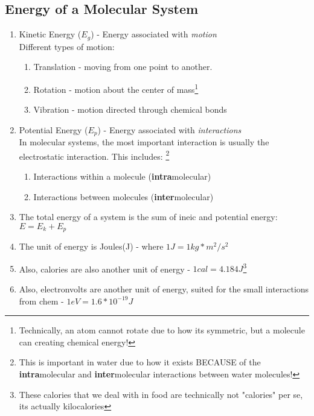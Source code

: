 \documentclass[../CHEM152Notes.tex]{subfiles}
\begin{document}
\subsection*{Energy of a Molecular System}
\begin{enumerate}
    \item Kinetic Energy ($E_g$) - Energy associated with \emph{motion} \\
    Different types of motion:
        \begin{enumerate}
            \item Translation - moving from one point to another.
            \item Rotation - motion about the center of mass\footnote{Technically, an atom cannot rotate due to how its symmetric, but a molecule can creating chemical energy!}
            \item Vibration - motion directed through chemical bonds
        \end{enumerate}
    \item Potential Energy ($E_p$) - Energy associated with \emph{interactions} \\
    In molecular systems, the most important interaction is usually the electrostatic interaction. This includes: \footnote{This is important in water due to how it exists BECAUSE of the \textbf{intra}molecular and \textbf{inter}molecular interactions between water molecules!}
        \begin{enumerate}
            \item Interactions within a molecule (\textbf{intra}molecular)
            \item Interactions between molecules (\textbf{inter}molecular)
        \end{enumerate}
    \item The total energy of a system is the sum of ineic and potential energy: $E = E_k + E_p$
    \item The unit of energy is Joules(J) - where $1J = 1kg*m^2/s^2$
    \item Also, calories are also another unit of energy - $1cal = 4.184J$\footnote{These calories that we deal with in food are technically not "calories" per se, its actually kilocalories}
    \item Also, electronvolts are another unit of energy, suited for the small interactions from chem - $1 eV = 1.6*10^{-19}J$
\end{enumerate}
\end{document}
